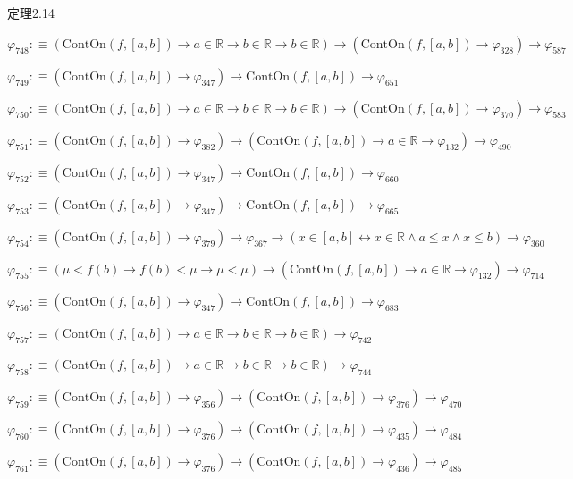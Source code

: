 \begin{fullproof}{定理2.14}
\begin{abbrevlist}
\item $\varphi_{748} :\equiv (\mathrm{ContOn}(f,[a,b]) \to a \in \mathbb{R} \to b \in \mathbb{R} \to b \in \mathbb{R}) \to (\mathrm{ContOn}(f,[a,b]) \to \varphi_{328}) \to \varphi_{587}$
\item $\varphi_{749} :\equiv (\mathrm{ContOn}(f,[a,b]) \to \varphi_{347}) \to \mathrm{ContOn}(f,[a,b]) \to \varphi_{651}$
\item $\varphi_{750} :\equiv (\mathrm{ContOn}(f,[a,b]) \to a \in \mathbb{R} \to b \in \mathbb{R} \to b \in \mathbb{R}) \to (\mathrm{ContOn}(f,[a,b]) \to \varphi_{370}) \to \varphi_{583}$
\item $\varphi_{751} :\equiv (\mathrm{ContOn}(f,[a,b]) \to \varphi_{382}) \to (\mathrm{ContOn}(f,[a,b]) \to a \in \mathbb{R} \to \varphi_{132}) \to \varphi_{490}$
\item $\varphi_{752} :\equiv (\mathrm{ContOn}(f,[a,b]) \to \varphi_{347}) \to \mathrm{ContOn}(f,[a,b]) \to \varphi_{660}$
\item $\varphi_{753} :\equiv (\mathrm{ContOn}(f,[a,b]) \to \varphi_{347}) \to \mathrm{ContOn}(f,[a,b]) \to \varphi_{665}$
\item $\varphi_{754} :\equiv (\mathrm{ContOn}(f,[a,b]) \to \varphi_{379}) \to \varphi_{367} \to (x \in [a,b] \leftrightarrow x \in \mathbb{R} \land a \leq x \land x \leq b) \to \varphi_{360}$
\item $\varphi_{755} :\equiv (\mu < f(b) \to f(b) < \mu \to \mu < \mu) \to (\mathrm{ContOn}(f,[a,b]) \to a \in \mathbb{R} \to \varphi_{132}) \to \varphi_{714}$
\item $\varphi_{756} :\equiv (\mathrm{ContOn}(f,[a,b]) \to \varphi_{347}) \to \mathrm{ContOn}(f,[a,b]) \to \varphi_{683}$
\item $\varphi_{757} :\equiv (\mathrm{ContOn}(f,[a,b]) \to a \in \mathbb{R} \to b \in \mathbb{R} \to b \in \mathbb{R}) \to \varphi_{742}$
\item $\varphi_{758} :\equiv (\mathrm{ContOn}(f,[a,b]) \to a \in \mathbb{R} \to b \in \mathbb{R} \to b \in \mathbb{R}) \to \varphi_{744}$
\item $\varphi_{759} :\equiv (\mathrm{ContOn}(f,[a,b]) \to \varphi_{356}) \to (\mathrm{ContOn}(f,[a,b]) \to \varphi_{376}) \to \varphi_{470}$
\item $\varphi_{760} :\equiv (\mathrm{ContOn}(f,[a,b]) \to \varphi_{376}) \to (\mathrm{ContOn}(f,[a,b]) \to \varphi_{435}) \to \varphi_{484}$
\item $\varphi_{761} :\equiv (\mathrm{ContOn}(f,[a,b]) \to \varphi_{376}) \to (\mathrm{ContOn}(f,[a,b]) \to \varphi_{436}) \to \varphi_{485}$

\end{abbrevlist}
\end{fullproof}
